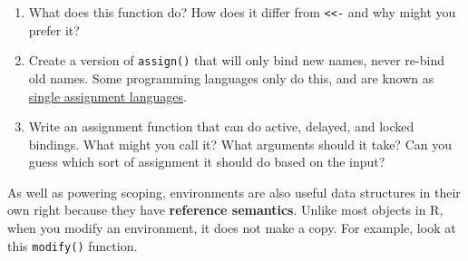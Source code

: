 \begin{enumerate}
\def\labelenumi{\arabic{enumi}.}
\item
  What does this function do? How does it differ from
  \texttt{\textless{}\textless{}-} and why might you prefer it?

\begin{Shaded}
\begin{Highlighting}[]
\StringTok{ } \NormalTok{()) \{}
  \NormalTok{())) \{}
    \NormalTok{(} \NormalTok{)}
    \NormalTok{)) \{}
     
  \NormalTok{\}}
\NormalTok{\}}
\NormalTok{(}\NormalTok{, }\NormalTok{)}
\StringTok{ }
\NormalTok{(}\NormalTok{, }\NormalTok{)}
\end{Highlighting}
\end{Shaded}
\item
  Create a version of \texttt{assign()} that will only bind new names,
  never re-bind old names. Some programming languages only do this, and
  are known as
  \href{http://en.wikipedia.org/wiki/Assignment_(computer_science)\#Single_assignment}{single
  assignment languages}.
\item
  Write an assignment function that can do active, delayed, and locked
  bindings. What might you call it? What arguments should it take? Can
  you guess which sort of assignment it should do based on the input?
\end{enumerate}


As well as powering scoping, environments are also useful data
structures in their own right because they have \textbf{reference
semantics}. Unlike most objects in R, when you modify an environment, it
does not make a copy. For example, look at this \texttt{modify()}
function.  

